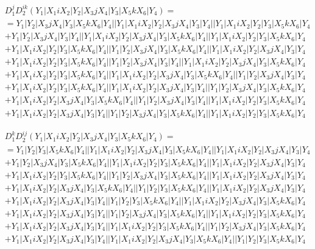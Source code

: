 \documentclass{article}[12pt]
\begin{document}
\begin{align*}
& D_1^jD_2^{ik}(Y_1|X_1iX_2|Y_2|X_3jX_4|Y_3|X_5kX_6|Y_4) =\\
&=Y_1|Y_2|X_3jX_4|Y_3|X_5kX_6|Y_4||Y_1|X_1iX_2|Y_2|X_3jX_4|Y_3|Y_4||Y_1|X_1iX_2|Y_2|Y_3|X_5kX_6|Y_4\\ 
 & +Y_1|Y_2|X_3jX_4|Y_3|Y_4||Y_1|X_1iX_2|Y_2|X_3jX_4|Y_3|X_5kX_6|Y_4||Y_1|X_1iX_2|Y_2|Y_3|X_5kX_6|Y_4\\ 
 & +Y_1|X_1iX_2|Y_2|Y_3|X_5kX_6|Y_4||Y_1|Y_2|X_3jX_4|Y_3|X_5kX_6|Y_4||Y_1|X_1iX_2|Y_2|X_3jX_4|Y_3|Y_4\\ 
 & +Y_1|X_1iX_2|Y_2|Y_3|X_5kX_6|Y_4||Y_1|Y_2|X_3jX_4|Y_3|Y_4||Y_1|X_1iX_2|Y_2|X_3jX_4|Y_3|X_5kX_6|Y_4\\ 
 & +Y_1|X_1iX_2|Y_2|Y_3|X_5kX_6|Y_4||Y_1|X_1iX_2|Y_2|X_3jX_4|Y_3|X_5kX_6|Y_4||Y_1|Y_2|X_3jX_4|Y_3|Y_4\\ 
 & +Y_1|X_1iX_2|Y_2|Y_3|X_5kX_6|Y_4||Y_1|X_1iX_2|Y_2|X_3jX_4|Y_3|Y_4||Y_1|Y_2|X_3jX_4|Y_3|X_5kX_6|Y_4\\ 
 & +Y_1|X_1iX_2|Y_2|X_3jX_4|Y_3|X_5kX_6|Y_4||Y_1|Y_2|X_3jX_4|Y_3|Y_4||Y_1|X_1iX_2|Y_2|Y_3|X_5kX_6|Y_4\\ 
 & +Y_1|X_1iX_2|Y_2|X_3jX_4|Y_3|Y_4||Y_1|Y_2|X_3jX_4|Y_3|X_5kX_6|Y_4||Y_1|X_1iX_2|Y_2|Y_3|X_5kX_6|Y_4\end{align*}

\begin{align*}
& D_1^kD_2^{ij}(Y_1|X_1iX_2|Y_2|X_3jX_4|Y_3|X_5kX_6|Y_4)=\\
& = Y_1|Y_2|Y_3|X_5kX_6|Y_4||Y_1|X_1iX_2|Y_2|X_3jX_4|Y_3|X_5kX_6|Y_4||Y_1|X_1iX_2|Y_2|X_3jX_4|Y_3|Y_4\\ 
 & +Y_1|Y_2|X_3jX_4|Y_3|X_5kX_6|Y_4||Y_1|X_1iX_2|Y_2|Y_3|X_5kX_6|Y_4||Y_1|X_1iX_2|Y_2|X_3jX_4|Y_3|Y_4\\ 
 & +Y_1|X_1iX_2|Y_2|Y_3|X_5kX_6|Y_4||Y_1|Y_2|X_3jX_4|Y_3|X_5kX_6|Y_4||Y_1|X_1iX_2|Y_2|X_3jX_4|Y_3|Y_4\\ 
 & +Y_1|X_1iX_2|Y_2|X_3jX_4|Y_3|X_5kX_6|Y_4||Y_1|Y_2|Y_3|X_5kX_6|Y_4||Y_1|X_1iX_2|Y_2|X_3jX_4|Y_3|Y_4\\ 
 & +Y_1|X_1iX_2|Y_2|X_3jX_4|Y_3|Y_4||Y_1|Y_2|Y_3|X_5kX_6|Y_4||Y_1|X_1iX_2|Y_2|X_3jX_4|Y_3|X_5kX_6|Y_4\\ 
 & +Y_1|X_1iX_2|Y_2|X_3jX_4|Y_3|Y_4||Y_1|Y_2|X_3jX_4|Y_3|X_5kX_6|Y_4||Y_1|X_1iX_2|Y_2|Y_3|X_5kX_6|Y_4\\ 
 & +Y_1|X_1iX_2|Y_2|X_3jX_4|Y_3|Y_4||Y_1|X_1iX_2|Y_2|Y_3|X_5kX_6|Y_4||Y_1|Y_2|X_3jX_4|Y_3|X_5kX_6|Y_4\\ 
 & +Y_1|X_1iX_2|Y_2|X_3jX_4|Y_3|Y_4||Y_1|X_1iX_2|Y_2|X_3jX_4|Y_3|X_5kX_6|Y_4||Y_1|Y_2|Y_3|X_5kX_6|Y_4\end{align*}
\end{document}
